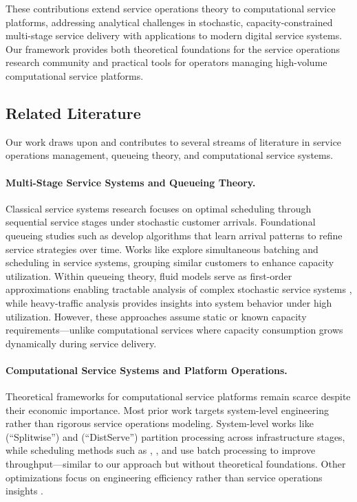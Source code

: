 \documentclass[poms,final,blindrev]{poms1_V1} %
\begin{document}
These contributions extend service operations theory to computational service platforms, addressing analytical challenges in stochastic, capacity-constrained multi-stage service delivery with applications to modern digital service systems. Our framework provides both theoretical foundations for the service operations research community and practical tools for operators managing high-volume computational service platforms.

\subsection{Related Literature}

Our work draws upon and contributes to several streams of literature in service operations management, queueing theory, and computational service systems.

\paragraph{Multi-Stage Service Systems and Queueing Theory.} 
Classical service systems research focuses on optimal scheduling through sequential service stages under stochastic customer arrivals. Foundational queueing studies such as \citet{devanur2009adwords,vee2010optimal,cole2014sample,balkanski2016power,lattanzi2020online} develop algorithms that learn arrival patterns to refine service strategies over time. Works like \citet{im2013online,lucier2013efficient,liu2015online,li2020online} explore simultaneous batching and scheduling in service systems, grouping similar customers to enhance capacity utilization. Within queueing theory, fluid models serve as first-order approximations enabling tractable analysis of complex stochastic service systems \citep{mandelbaum1998strong,maglaras2000discrete,bauerle2002optimal,liu2011network}, while heavy-traffic analysis provides insights into system behavior under high utilization. However, these approaches assume static or known capacity requirements—unlike computational services where capacity consumption grows dynamically during service delivery.

\paragraph{Computational Service Systems and Platform Operations.} 
Theoretical frameworks for computational service platforms remain scarce despite their economic importance. Most prior work targets system-level engineering rather than rigorous service operations modeling. System-level works like \citet{patel2023peeling} (``Splitwise'') and \citet{zhong2024distserve} (``DistServe'') partition processing across infrastructure stages, while scheduling methods such as \citet{yu2022orca}, \citet{agrawal2023sarathi}, and \citet{agrawal2024taming} use batch processing to improve throughput—similar to our approach but without theoretical foundations. Other optimizations focus on engineering efficiency rather than service operations insights \citep{deepseekai2024deepseekv2strongeconomicalefficient, fu2025efficient}.
\end{document}
